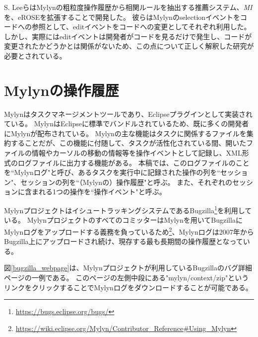 \documentclass[a4paper]{jsbook}
\begin{document}
S. Leeら\cite{SLee:2015}はMylynの粗粒度操作履歴から相関ルールを抽出する推薦システム、{\it MI}を、eROSE\cite{Zimmermann:2005}を拡張することで開発した。
彼らはMylynのselectionイベントをコードへの参照として、editイベントをコードへの変更としてそれぞれ利用した。
しかし、実際にはeditイベントは開発者がコードを見るだけで発生し、コードが変更されたかどうかとは関係がないため、この点について正しく解釈した研究が必要とされている。

\chapter{Mylynの操作履歴}\label{mylyn_chap}
Mylyn\cite{Kersten:2005}はタスクマネージメントツールであり、Eclipseプラグインとして実装されている。
MylynはEclipseに標準でバンドルされているため、既に多くの開発者にMylynが配布されている。
Mylynの主な機能はタスクに関係するファイルを集約することだが、この機能に付随して、タスクが活性化されている間、開いたファイルの情報やカーソルの移動の情報等を操作イベントとして記録し、XML形式のログファイルに出力する機能がある。
本稿では、このログファイルのことを``Mylynログ"と呼び、あるタスクを実行中に記録された操作の列を``セッション"、セッションの列を``（Mylynの）操作履歴"と呼ぶ。
また、それぞれのセッションに含まれる1つの操作を``操作イベント"と呼ぶ。

MylynプロジェクトはイシュートラッキングシステムであるBugzilla\footnote{\url{https://bugs.eclipse.org/bugs/}}を利用している。
MylynプロジェクトのすべてのコミッターはMylynを用いてBugzillaにMylynログをアップロードする義務を負っているため\footnote{\url{https://wiki.eclipse.org/Mylyn/Contributor_Reference\#Using_Mylyn}}、Mylynログは2007年からBugzilla上にアップロードされ続け、現存する最も長期間の操作履歴となっている。

図\ref{bugzilla_webpage}は、Mylynプロジェクトが利用しているBugzillaのバグ詳細ページの一例である。
このページの左側中段にある"mylyn/context/zip"というリンクをクリックすることでMylynログをダウンロードすることが可能である。
\end{document}
